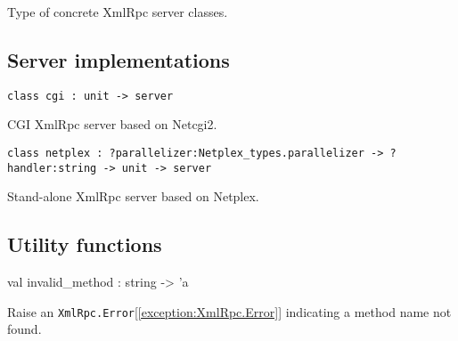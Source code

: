 \documentclass[11pt]{article}
\begin{document}
\begin{ocamldocdescription}
Type of concrete XmlRpc server classes.


\end{ocamldocdescription}




\subsection{Server implementations}




\begin{ocamldoccode}
{\tt{class cgi : }}{\tt{unit -> }}{\tt{server}}\end{ocamldoccode}
\label{class:XmlRpcServer.cgi}



\begin{ocamldocdescription}
CGI XmlRpc server based on Netcgi2.


\end{ocamldocdescription}




\begin{ocamldoccode}
{\tt{class netplex : }}{\tt{?parallelizer:Netplex\_types.parallelizer -> ?handler:string -> unit -> }}{\tt{server}}\end{ocamldoccode}
\label{class:XmlRpcServer.netplex}



\begin{ocamldocdescription}
Stand-alone XmlRpc server based on Netplex.


\end{ocamldocdescription}




\subsection{Utility functions}




\label{val:XmlRpcServer.invalid-underscoremethod}\begin{ocamldoccode}
val invalid_method : string -> 'a
\end{ocamldoccode}
\begin{ocamldocdescription}
Raise an {\tt{XmlRpc.Error}}[\ref{exception:XmlRpc.Error}] indicating a method name not found.


\end{ocamldocdescription}
\end{document}
